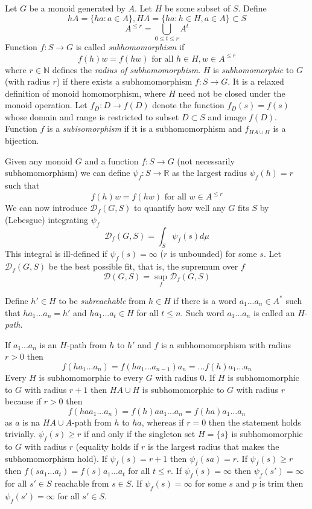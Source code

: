 \documentclass[12pt]{article}
\begin{document}
Let $G$ be a monoid generated by $A$. Let $H$ be some subset of $S$. Define 
\[
hA=\{ha:a\in A\},HA=\{ha:h\in H, a\in A\}\subset S
\]
\[
A^{\le r}=\bigcup_{0 \le t \le r} A^t 
\]
Function $f:S \rightarrow G$ is called \textit{subhomomorphism} if 
\[
f(h)w=f(hw)\text{ for all }h\in H, w\in A^{\le r}
\]
where $r\in \mathbb{N}$ defines the \textit{radius of subhomomorphism}.
$H$ is \textit{subhomomorphic} to $G$ (with radius $r$) if there exists a subhomomorphism $f:S \rightarrow G$. It is a relaxed definition of monoid homomorphism, where $H$ need not be closed under the monoid operation. Let $f_D:D\rightarrow f(D)$ denote the function $f_D(s)=f(s)$ whose domain and range is restricted to subset $D\subset S$ and image $f(D)$. 
Function $f$ is a \textit{subisomorphism} if it is a subhomomorphism and $f_{HA \cup H}$ is a bijection. 


Given any monoid $G$ and a function $f:S\rightarrow G$ (not necessarily subhomomorphism) we can define $\psi_f:S \rightarrow \mathbb{R}$ as the largest radius $\psi_f(h)=r$ such that
\[
f(h)w=f(hw)\text{ for all } w\in A^{\le r}
\]
We can now introduce $\mathcal{D}_f(G,S)$ to quantify how well any $G$ fits $S$ by (Lebesgue) integrating $\psi_f$
\[
\mathcal{D}_f(G,S) = \int_S \psi_f(s) d \mu
\]
This integral is ill-defined if $\psi_f(s)=\infty$ ($r$ is unbounded) for some $s$.
Let $\mathcal{D}_f(G,S)$ be the best possible fit, that is, the supremum over $f$ \[
\mathcal{D}(G,S) = \sup_f \mathcal{D}_f(G,S)
\]

Define $h'\in H$ to be \textit{subreachable} from $h\in H$ if there is a word $a_1...a_n\in A^*$ such that $ha_1...a_n=h'$ and $ha_1...a_t\in H$ for all $t\le n$. Such word $a_1...a_n$ is called an $H$-\textit{path}.

 
If $a_1...a_n$ is an $H$-path from $h$ to $h'$ and $f$ is a subhomomorphism with radius $r>0$ then \[
	f(ha_1...a_n)=f(ha_1...a_{n-1})a_n=...f(h)a_1...a_n
\]
Every $H$ is subhomomorphic to every $G$ with radius $0$.
If $H$ is subhomomorphic to $G$ with radius $r+1$ then $HA\cup H$ is subhomomorphic to $G$ with radius $r$ because  if $r>0$ then
\[
f(haa_1...a_n)=f(h)aa_1...a_n=f(ha)a_1...a_n
\]
as $a$ is na $HA\cup A$-path from $h$ to $ha$, whereas if $r=0$ then the statement holds trivially.
$\psi_f(s)\ge r$ if and only if the singleton set $H=\{s\}$ is subhomomorphic to $G$ with radius $r$ (equality holds if $r$ is the largest radius that makes the subhomomorphism hold). 
If $\psi_f(s)= r+1$ then $\psi_f(sa)= r$. If $\psi_f(s)\ge r$ then $f(sa_1...a_t)=f(s)a_1...a_t$ for all $t\le r$.
If $\psi_f(s)=\infty$ then $\psi_f(s')=\infty$ for all $s'\in S$ reachable from $s\in S$. If $\psi_f(s)=\infty$ for some $s$ and $p$ is trim then $\psi_f(s')=\infty$ for all $s'\in S$.
\end{document}
